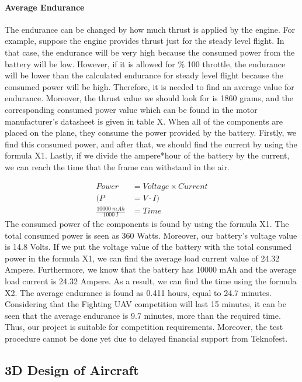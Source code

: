 \documentclass[12pt]{article}
\begin{document}
\paragraph*{Average Endurance} The endurance can be changed by how much thrust is applied by the engine. For example, suppose the engine provides thrust just for the steady level flight. In that case, the endurance will be very high because the consumed power from the battery will be low. However, if it is allowed for \% 100 throttle, the endurance will be lower than the calculated endurance for steady level flight because the consumed power will be high. Therefore, it is needed to find an average value for endurance. Moreover, the thrust value we should look for is 1860 grams, and the corresponding consumed power value which can be found in the motor manufacturer’s datasheet is given in table X. When all of the components are placed on the plane, they consume the power provided by the battery. Firstly, we find this consumed power, and after that, we should find the current by using the formula X1. Lastly, if we divide the ampere*hour of the battery by the current, we can reach the time that the frame can withstand in the air.

\begin{align}
	Power&= Voltage  \times Current \\
	 (P &= V \cdot I)\\
	\frac{10000 \ mAh}{1000 \ I } &= Time 
\end{align}
The consumed power of the components is found by using the formula X1. The total consumed power is seen as 360 Watts. Moreover, our battery’s voltage value is 14.8 Volts. If we put the voltage value of the battery with the total consumed power in the formula X1, we can find the average load current value of 24.32 Ampere. Furthermore, we know that the battery has 10000 mAh and the average load current is 24.32 Ampere. As a result, we can find the time using the formula X2. The average endurance is found as 0.411 hours, equal to 24.7 minutes. Considering that the Fighting UAV competition will last 15 minutes, it can be seen that the average endurance is 9.7 minutes, more than the required time. Thus, our project is suitable for competition requirements.  Moreover, the test procedure cannot be done yet due to delayed financial support from Teknofest.

\subsection{3D Design of Aircraft}
\end{document}
